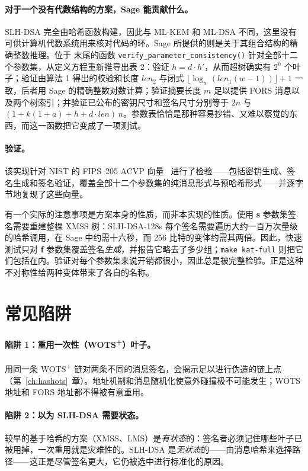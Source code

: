 \paragraph{对于一个没有代数结构的方案，Sage 能贡献什么。}
SLH-DSA 完全由哈希函数构建，因此与 ML-KEM 和 ML-DSA 不同，这里没有可供计算机代数系统用来核对代码的环。Sage 所提供的则是关于其组合结构的精确整数推理。位于  末尾的函数 \texttt{verify\_parameter\_consistency()} 针对全部十二个参数集，从定义方程重新推导出表 2：验证 $h = d\cdot h'$，从而超树确实有 $2^{h}$ 个叶子；验证由算法 1 得出的校验和长度 $len_2$ 与闭式 $\lfloor \log_w(len_1(w-1)) \rfloor + 1$ 一致，后者用 Sage 的精确整数对数计算；验证摘要长度 $m$ 足以提供 FORS 消息以及两个树索引；并验证已公布的密钥尺寸和签名尺寸分别等于 $2n$ 与 $(1 + k(1+a) + h + d\cdot len)\,n$。参数表恰恰是那种容易抄错、又难以察觉的东西，而这一函数把它变成了一项测试。

\paragraph{验证。}
该实现针对 NIST 的 FIPS~205 ACVP 向量~\cite{acvp} 进行了检验——包括密钥生成、签名生成和签名验证，覆盖全部十二个参数集的纯消息形式与预哈希形式——并逐字节地复现了这些向量。

有一个实际的注意事项是方案本身的性质，而非本实现的性质。使用 \textbf{s} 参数集签名需要重建整棵 XMSS 树：SLH-DSA-128s 每个签名需要遍历大约一百万次量级的哈希调用，在 Sage 中约需十六秒，而 256 比特的变体约需其两倍。因此，快速测试只对 \textbf{f} 参数集覆盖签名\emph{生成}，并报告它略去了多少组；\texttt{make kat-full} 则把它们包括在内。验证对每个参数集来说开销都很小，因此总是被完整检验。正是这种不对称性给两种变体带来了各自的名称。

\section{常见陷阱}

\paragraph{陷阱 1：重用一次性（WOTS\textsuperscript{+}）叶子。}
用同一条 WOTS\textsuperscript{+} 链对两条不同的消息签名，会揭示足以进行伪造的链上点（第~\ref{ch:hashots}~章）。地址机制和消息随机化使意外碰撞极不可能发生；WOTS 地址和 FORS 地址都不得被有意重用。

\paragraph{陷阱 2：以为 SLH-DSA 需要状态。}
较早的基于哈希的方案（XMSS、LMS）是\emph{有状态}的：签名者必须记住哪些叶子已被用掉，一次重用就是灾难性的。SLH-DSA 是\emph{无状态}的——由消息哈希来选择路径——这正是尽管签名更大，它仍被选中进行标准化的原因。

